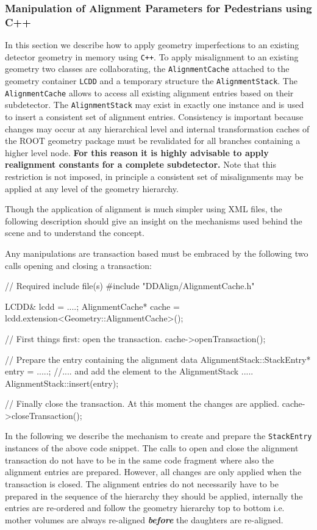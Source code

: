\documentclass[10pt,a4paper]{article}
\begin{document}
\noindent
\subsubsection{Manipulation of Alignment Parameters for Pedestrians using C++}
\label{sec:ddalign-user-manual-misalignment-manip-cxx}
\noindent
In this section we describe how to apply geometry imperfections to an existing 
detector geometry in memory using {\tt C++}. To apply misalignment to an existing
geometry two classes are collaborating, the {\tt AlignmentCache} attached to
the geometry container {\tt LCDD} and a temporary structure the {\tt AlignmentStack}.
The {\tt AlignmentCache} allows to access all existing alignment entries 
based on their subdetector.
The {\tt AlignmentStack} may exist in exactly one instance and is used to
insert a consistent set of alignment entries. Consistency is important because
changes may occur at any hierarchical level and internal transformation caches
of the ROOT geometry package must be revalidated for all branches containing
a higher level node.
{\bf For this reason it is highly advisable to apply realignment constants 
for a complete subdetector.}
Note that this restriction is not imposed, in principle a consistent set 
of misalignments may be applied at any level of the geometry hierarchy.

\noindent
Though the application of alignment is much simpler using XML files, the following
description should give an insight on the mechanisms used behind the scene and
to understand the concept.

\noindent
Any manipulations are transaction based must be embraced by the following two calls
opening and closing a transaction:
\begin{code}
// Required include file(s)
#include "DDAlign/AlignmentCache.h"

    LCDD& lcdd = ....;
    AlignmentCache* cache = lcdd.extension<Geometry::AlignmentCache>();

    // First things first: open the transaction.
    cache->openTransaction();

    // Prepare the entry containing the alignment data
    AlignmentStack::StackEntry* entry =  .....;
    //.... and add the element to the AlignmentStack .....
    AlignmentStack::insert(entry);

    // Finally close the transaction. At this moment the changes are applied.
    cache->closeTransaction();
\end{code}
In the following we describe the mechanism to create and prepare the 
{\tt StackEntry} instances of the above code snippet. The calls to open and close
the alignment transaction do not have to be in the same code fragment where also
the alignment entries are prepared. However, all changes are only applied when 
the transaction is closed. The alignment entries do not necessarily have to 
be prepared in the sequence of the hierarchy they should be applied, internally
the entries are re-ordered and follow the geometry hierarchy top to bottom
i.e. mother volumes are always re-aligned {\it\bf before} the daughters 
are re-aligned.
\end{document}
